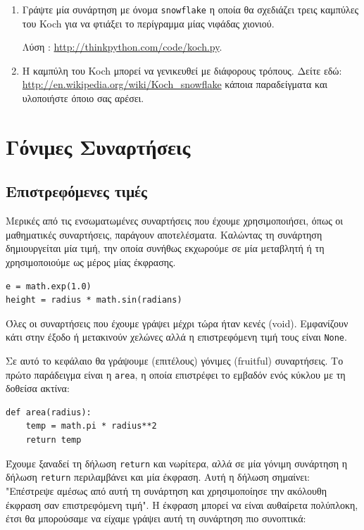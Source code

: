 \documentclass[10pt]{book}
\begin{document}
\begin{exercise}
\begin{enumerate}
\item Γράψτε μία συνάρτηση με όνομα  {\tt snowflake}  η οποία θα σχεδιάζει
τρεις καμπύλες του  Koch  για να φτιάξει το περίγραμμα μίας νιφάδας χιονιού.

Λύση : \url{http://thinkpython.com/code/koch.py}.

\item Η καμπύλη του Koch μπορεί να γενικευθεί με διάφορους τρόπους.
Δείτε εδώ: \url{http://en.wikipedia.org/wiki/Koch_snowflake}  κάποια
παραδείγματα και υλοποιήστε όποιο σας αρέσει.

\end{enumerate}

\end{exercise}

\chapter{Γόνιμες Συναρτήσεις}
\label{fruitchap}

\section{Επιστρεφόμενες τιμές}

Μερικές από τις ενσωματωμένες συναρτήσεις που έχουμε χρησιμοποιήσει, όπως οι
μαθηματικές συναρτήσεις, παράγουν αποτελέσματα. Καλώντας τη συνάρτηση δημιουργείται μία τιμή, την οποία συνήθως εκχωρούμε σε μία μεταβλητή ή τη χρησιμοποιούμε ως μέρος μίας έκφρασης.

\begin{verbatim}
e = math.exp(1.0)
height = radius * math.sin(radians)
\end{verbatim}
%

Όλες οι συναρτήσεις που έχουμε γράψει μέχρι τώρα ήταν κενές (void). 
Εμφανίζουν κάτι στην έξοδο ή μετακινούν χελώνες αλλά η επιστρεφόμενη τιμή τους
είναι {\tt None}. 

Σε αυτό το κεφάλαιο θα γράψουμε (επιτέλους) γόνιμες (fruitful) συναρτήσεις.
Το πρώτο παράδειγμα είναι η {\tt area}, η οποία επιστρέφει το εμβαδόν ενός κύκλου με τη δοθείσα ακτίνα:

\begin{verbatim}
def area(radius):
    temp = math.pi * radius**2
    return temp
\end{verbatim}
%

Έχουμε ξαναδεί τη δήλωση {\tt return} και νωρίτερα, αλλά σε μία γόνιμη
συνάρτηση η δήλωση {\tt return} περιλαμβάνει και μία έκφραση. Αυτή η δήλωση σημαίνει: "Επέστρεψε αμέσως από αυτή τη συνάρτηση και χρησιμοποίησε την ακόλουθη έκφραση σαν επιστρεφόμενη τιμή". Η έκφραση μπορεί να είναι αυθαίρετα πολύπλοκη, έτσι θα μπορούσαμε να είχαμε γράψει αυτή τη συνάρτηση πιο συνοπτικά:
\end{document}
